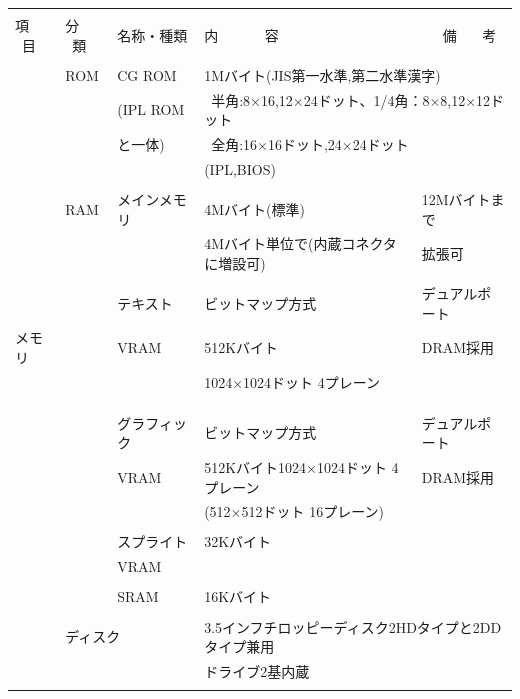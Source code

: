 ﻿\documentclass[twoside,a4paper,12pt]{article}
\begin{document}
\setlength{\tabcolsep}{0.5mm}
\begin{tabular}{|p{17mm}|p{13mm}|p{23mm}|p{80mm}|p{30mm}|}
\hline
& & & &\\[-2mm]
項 \ 目& 分 \ 類 & 名称・種類 & 内 \ \ \ \ \ \ 容 & \ \ \ 備 \ \ \ 考\\[1mm]
\hline
& & & \multicolumn{2}{l|}{}\\[-3mm]
& ROM & CG ROM & \multicolumn{2}{l|}{1Mバイト(JIS第一水準,第二水準漢字)}\\
& & (IPL ROM & \multicolumn{2}{l|}{\ 半角:8×16,12×24ドット、1/4角：8×8,12×12ドット}\\
& & と一体) & \multicolumn{2}{l|}{\ 全角:16×16ドット,24×24ドット}\\
& & & \multicolumn{2}{l|}{(IPL,BIOS)}\\
\cline{2-5}
& & & &\\[-3mm]
& RAM & メインメモリ & 4Mバイト(標準) & 12Mバイトまで\\
& & & 4Mバイト単位で(内蔵コネクタに増設可) & 拡張可\\
\cline{3-5}
& & & &\\[-3mm]
& & テキスト & ビットマップ方式 & デュアルポート\\
メモリ & & VRAM & 512Kバイト & DRAM採用\\
& & & 1024×1024ドット 4プレーン &\\
& & & &\\
& & & &\\
\cline{3-5}
& & & &\\[-3mm]
& & グラフィック & ビットマップ方式 & デュアルポート\\
& & VRAM & 512Kバイト1024×1024ドット 4プレーン & DRAM採用\\
& & & (512×512ドット 16プレーン) &\\
\cline{3-5}
& & & \multicolumn{2}{l|}{}\\[-3mm]
& & スプライト & \multicolumn{2}{l|}{32Kバイト}\\
& & VRAM & \multicolumn{2}{l|}{}\\
\cline{3-5}
& & & \multicolumn{2}{l|}{}\\[-3mm]
& & SRAM & \multicolumn{2}{l|}{16Kバイト}\\
\hline
& \multicolumn{4}{l|}{}\\[-3mm]
& \multicolumn{2}{l}{ディスク} & \multicolumn{2}{l|}{3.5インフチロッピーディスク2HDタイプと2DDタイプ兼用}\\
& \multicolumn{2}{l}{} & \multicolumn{2}{l|}{ドライブ2基内蔵}\\
& \multicolumn{4}{l|}{}\\

\end{tabular}
\end{document}
